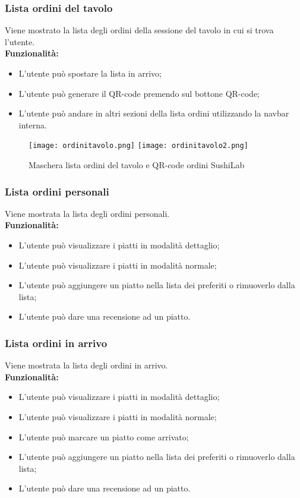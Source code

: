 \subsubsection{Lista ordini del tavolo}
Viene mostrato la lista degli ordini della sessione del tavolo in cui si trova l'utente.\\
\textbf{Funzionalità:}
\begin{itemize}
    \item L'utente può spostare la lista in arrivo;
    \item L'utente può generare il QR-code premendo sul bottone QR-code;
    \item L'utente può andare in altri sezioni della lista ordini utilizzando la navbar interna.
\end{itemize}
\begin{figure}[H]
    \centering
    \texttt{[image: ordinitavolo.png]}
    \texttt{[image: ordinitavolo2.png]}
    \caption{Maschera lista ordini del tavolo e QR-code ordini SushiLab}
\end{figure}
\pagebreak

\subsubsection{Lista ordini personali}
Viene mostrata la lista degli ordini personali.\\
\textbf{Funzionalità:}
\begin{itemize}
    \item L'utente può visualizzare i piatti in modalità dettaglio;
    \item L'utente può visualizzare i piatti in modalità normale;
    \item L'utente può aggiungere un piatto nella lista dei preferiti o rimuoverlo dalla lista;
    \item L'utente può dare una recensione ad un piatto.
\end{itemize}


\subsubsection{Lista ordini in arrivo}
Viene mostrata la lista degli ordini in arrivo.\\
\textbf{Funzionalità:}
\begin{itemize}
    \item L'utente può visualizzare i piatti in modalità dettaglio;
    \item L'utente può visualizzare i piatti in modalità normale;
    \item L'utente può marcare un piatto come arrivato;
    \item L'utente può aggiungere un piatto nella lista dei preferiti o rimuoverlo dalla lista;
    \item L'utente può dare una recensione ad un piatto.
\end{itemize}


